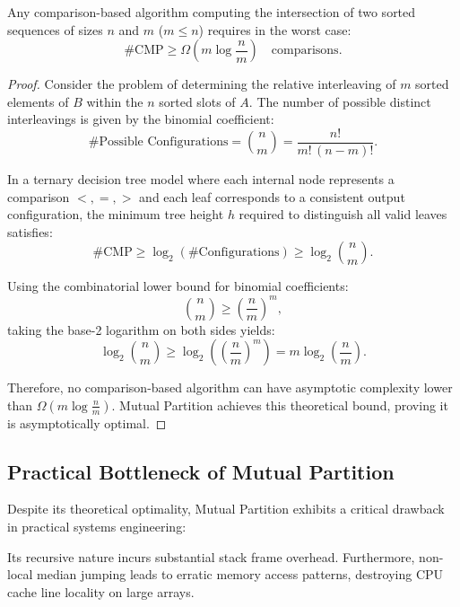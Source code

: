 \begin{theorem}
Any comparison-based algorithm computing the intersection of two sorted sequences of sizes $n$ and $m$ ($m \le n$) requires in the worst case:
\begin{equation}
  \#\text{CMP} \ge \Omega\left(m \log \frac{n}{m}\right) \quad \text{comparisons}.
\end{equation}
\end{theorem}
\begin{proof}
Consider the problem of determining the relative interleaving of $m$ sorted elements of $B$ within the $n$ sorted slots of $A$. The number of possible distinct interleavings is given by the binomial coefficient:
\begin{equation}
  \#\text{Possible Configurations} = \binom{n}{m} = \frac{n!}{m! \, (n - m)!}.
\end{equation}

In a ternary decision tree model where each internal node represents a comparison $<, =, >$ and each leaf corresponds to a consistent output configuration, the minimum tree height $h$ required to distinguish all valid leaves satisfies:
\begin{equation}
  \#\text{CMP} \ge \log_2(\#\text{Configurations}) \ge \log_2 \binom{n}{m}.
\end{equation}

Using the combinatorial lower bound for binomial coefficients:
\begin{equation}
  \binom{n}{m} \ge \left(\frac{n}{m}\right)^m,
\end{equation}
taking the base-2 logarithm on both sides yields:
\begin{equation}
  \log_2 \binom{n}{m} \ge \log_2 \left(\left(\frac{n}{m}\right)^m\right) = m \log_2 \left(\frac{n}{m}\right).
\end{equation}

Therefore, no comparison-based algorithm can have asymptotic complexity lower than $\Omega\left(m \log \frac{n}{m}\right)$. Mutual Partition achieves this theoretical bound, proving it is asymptotically optimal.
\end{proof}

\subsection{Practical Bottleneck of Mutual Partition}
Despite its theoretical optimality, Mutual Partition exhibits a critical drawback in practical systems engineering:
\begin{center}
\end{center}
Its recursive nature incurs substantial stack frame overhead. Furthermore, non-local median jumping leads to erratic memory access patterns, destroying CPU cache line locality on large arrays.

